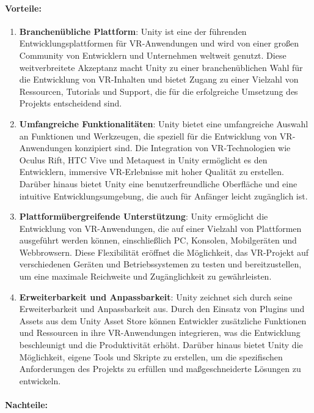 \paragraph{Vorteile:}

\begin{enumerate}
\item \textbf{Branchenübliche Plattform}: Unity ist eine der führenden Entwicklungsplattformen für VR-Anwendungen und wird von einer großen Community von Entwicklern und Unternehmen weltweit genutzt. Diese weitverbreitete Akzeptanz macht Unity zu einer branchenüblichen Wahl für die Entwicklung von VR-Inhalten und bietet Zugang zu einer Vielzahl von Ressourcen, Tutorials und Support, die für die erfolgreiche Umsetzung des Projekts entscheidend sind.
\item \textbf{Umfangreiche Funktionalitäten}: Unity bietet eine umfangreiche Auswahl an Funktionen und Werkzeugen, die speziell für die Entwicklung von VR-Anwendungen konzipiert sind. Die Integration von VR-Technologien wie Oculus Rift, HTC Vive und Metaquest in Unity ermöglicht es den Entwicklern, immersive VR-Erlebnisse mit hoher Qualität zu erstellen. Darüber hinaus bietet Unity eine benutzerfreundliche Oberfläche und eine intuitive Entwicklungsumgebung, die auch für Anfänger leicht zugänglich ist.

\item \textbf{Plattformübergreifende Unterstützung}: Unity ermöglicht die Entwicklung von VR-Anwendungen, die auf einer Vielzahl von Plattformen ausgeführt werden können, einschließlich PC, Konsolen, Mobilgeräten und Webbrowsern. Diese Flexibilität eröffnet die Möglichkeit, das VR-Projekt auf verschiedenen Geräten und Betriebssystemen zu testen und bereitzustellen, um eine maximale Reichweite und Zugänglichkeit zu gewährleisten.

\item \textbf{Erweiterbarkeit und Anpassbarkeit}: Unity zeichnet sich durch seine Erweiterbarkeit und Anpassbarkeit aus. Durch den Einsatz von Plugins und Assets aus dem Unity Asset Store können Entwickler zusätzliche Funktionen und Ressourcen in ihre VR-Anwendungen integrieren, was die Entwicklung beschleunigt und die Produktivität erhöht. Darüber hinaus bietet Unity die Möglichkeit, eigene Tools und Skripte zu erstellen, um die spezifischen Anforderungen des Projekts zu erfüllen und maßgeschneiderte Lösungen zu entwickeln.
\end{enumerate}

\paragraph{Nachteile:}

